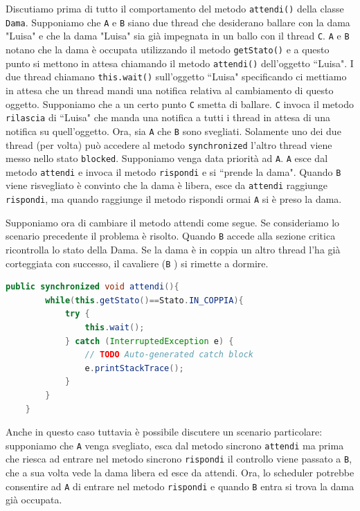 \documentclass{article}
\begin{document}
Discutiamo prima di tutto il comportamento del metodo \texttt{attendi()} della classe \texttt{Dama}. Supponiamo che \texttt{A} e \texttt{B} siano due thread che desiderano ballare con la dama "Luisa" e che la dama "Luisa" sia gi\`a impegnata in un ballo con il thread \texttt{C}. \texttt{A} e \texttt{B} notano che la dama \`e occupata utilizzando il metodo \texttt{getStato()} e a questo punto si mettono in attesa chiamando il metodo \texttt{attendi()} dell'oggetto ``Luisa". I due thread chiamano \texttt{this.wait()} sull'oggetto ``Luisa" specificando ci mettiamo in attesa che un thread mandi una notifica relativa al cambiamento di questo oggetto. Supponiamo che a un certo punto \texttt{C} smetta di ballare. \texttt{C} invoca il metodo \texttt{rilascia} di ``Luisa" che manda una notifica a tutti i thread in attesa di una notifica su quell'oggetto. Ora, sia \texttt{A} che \texttt{B} sono svegliati. Solamente uno dei due thread (per volta)  pu\`o accedere al metodo \texttt{synchronized} l'altro thread viene messo nello stato \texttt{blocked}. Supponiamo venga data priorit\`a ad \texttt{A}. \texttt{A} esce dal metodo \texttt{attendi} e invoca il metodo \texttt{rispondi} e si ``prende la dama". Quando \texttt{B} viene risvegliato \`e convinto che la dama \`e libera, esce da \texttt{attendi} raggiunge \texttt{rispondi}, ma quando raggiunge il metodo rispondi ormai \texttt{A} si \`e preso la dama.

 
Supponiamo ora di cambiare il metodo attendi come segue. Se consideriamo lo scenario precedente il problema \`e risolto. Quando \texttt{B} accede alla sezione critica ricontrolla lo stato della Dama. Se la dama \`e in coppia un altro thread l'ha gi\`a corteggiata con successo, il cavaliere (\texttt{B} ) si rimette a dormire.
\begin{lstlisting}[language=Java]
public synchronized void attendi(){
		while(this.getStato()==Stato.IN_COPPIA){
			try {
				this.wait();
			} catch (InterruptedException e) {
				// TODO Auto-generated catch block
				e.printStackTrace();
			}
		}
	}
\end{lstlisting}
Anche in questo caso tuttavia \`e possibile discutere un scenario particolare: supponiamo che \texttt{A} venga svegliato, esca dal metodo sincrono \texttt{attendi} ma prima che riesca ad entrare nel metodo sincrono \texttt{rispondi} il controllo viene passato a \texttt{B}, che a sua volta vede la dama libera ed esce da attendi. Ora, lo scheduler potrebbe consentire ad \texttt{A} di entrare nel metodo \texttt{rispondi} e quando \texttt{B} entra si trova la dama gi\`a occupata.
\end{document}
